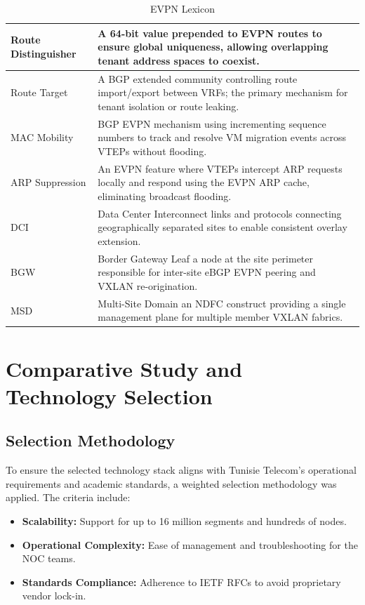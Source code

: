 \begin{table}[!htbp]
\begin{tabularx}{\textwidth}{l X}
        Route Distinguisher & A 64-bit value prepended to EVPN routes to ensure global uniqueness, allowing overlapping tenant address spaces to coexist. \\ \midrule
        Route Target & A BGP extended community controlling route import/export between VRFs; the primary mechanism for tenant isolation or route leaking. \\ \midrule
        MAC Mobility & BGP EVPN mechanism using incrementing sequence numbers to track and resolve VM migration events across VTEPs without flooding. \\ \midrule
        ARP Suppression & An EVPN feature where VTEPs intercept ARP requests locally and respond using the EVPN ARP cache, eliminating broadcast flooding. \\ \midrule
        DCI & Data Center Interconnect links and protocols connecting geographically separated sites to enable consistent overlay extension. \\ \midrule
        BGW & Border Gateway Leaf a node at the site perimeter responsible for inter-site eBGP EVPN peering and VXLAN re-origination. \\ \midrule
        MSD & Multi-Site Domain an NDFC construct providing a single management plane for multiple member VXLAN fabrics. \\
        \bottomrule
    \end{tabularx}
    \caption{EVPN Lexicon}
    \label{tab:evpn-lexicon}
\end{table}

\section{Comparative Study and Technology Selection}
\subsection{Selection Methodology}
To ensure the selected technology stack aligns with Tunisie Telecom's operational requirements and academic standards, a weighted selection methodology was applied. The criteria include:
\begin{itemize}
    \item \textbf{Scalability:} Support for up to 16 million segments and hundreds of nodes.
    \item \textbf{Operational Complexity:} Ease of management and troubleshooting for the NOC teams.
    \item \textbf{Standards Compliance:} Adherence to IETF RFCs to avoid proprietary vendor lock-in.
\end{itemize}


